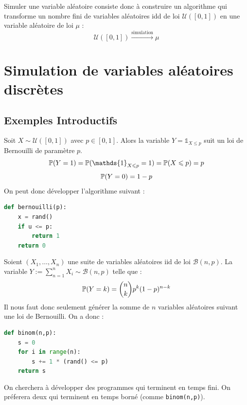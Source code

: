Simuler une variable aléatoire consiste donc à construire un algorithme qui transforme un nombre fini de variables 
aléatoires idd de loi $ \mathcal{U}([0,1])$ en une variable aléatoire de loi $ \mu$ : 
    \[ \mathcal{U}([0,1]) \overset{\text{simulation}}{\longrightarrow} \mu \] 


\section{Simulation de variables aléatoires discrètes}

\subsection{Exemples Introductifs}

\begin{example}
    Soit $X \sim \mathcal{U}([0,1])$ avec $p \in [0,1]$. Alors la variable $Y = \mathds{1}_{X \leqslant p}$  
    suit un loi de Bernouilli de paramètre $p$. 
        \[ \myP(Y = 1) = \myP(\mathds{1}_{X \leqslant p} = 1) = \myP(X \leqslant p) = p \]  
        \[ \mathbb{P}(Y = 0) = 1 - p \] 
    On peut donc développer l'algorithme suivant :
    \begin{lstlisting}[language=Python]
def bernouilli(p): 
    x = rand()
    if u <= p: 
        return 1 
    return 0
    \end{lstlisting}
\end{example}

\begin{example}
    Soient $(X_1, \dots, X_n)$ une suite de variables aléatoires iid de loi $ \mathcal{B}(n,p)$. 
    La variable $ Y := \sum_{n=1}^{n} X_i \sim \mathcal{B}(n,p)$ telle que : 
        \[ \mathbb{P}(Y = k) = \binom{n}{k} p^k (1-p)^{n-k} \] 
    Il nous faut donc seulement générer la somme de $n$ variables aléatoires suivant une loi de Bernouilli. On a donc : 
        \begin{lstlisting}[language=Python]
def binom(n,p):
    s = 0 
    for i in range(n):
        s += 1 * (rand() <= p) 
    return s
    \end{lstlisting} 
\end{example}

On cherchera à développer des programmes qui terminent en temps fini. On préferera deux qui terminent 
en temps borné (comme \texttt{binom(n,p)}). 


